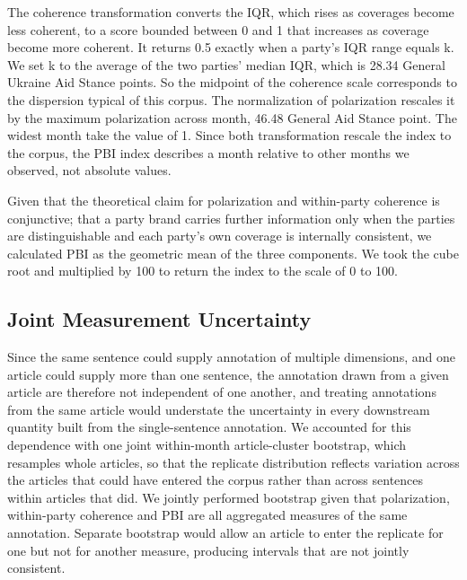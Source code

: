 The coherence transformation converts the IQR, which rises as coverages become less coherent, to a score bounded between 0 and 1 that increases as coverage become more coherent. It returns 0.5 exactly when a party's IQR range equals k. We set k to the average of the two parties' median IQR, which is 28.34 General Ukraine Aid Stance points. So the midpoint of the coherence scale corresponds to the dispersion typical of this corpus. The normalization of polarization rescales it by the maximum polarization across month, 46.48 General Aid Stance point. The widest month take the value of 1. Since both transformation rescale the index to the corpus, the PBI index describes a month relative to other months we observed, not absolute values.

Given that the theoretical claim for polarization and within-party coherence is conjunctive; that a party brand carries further information only when the parties are distinguishable and each party's own coverage is internally consistent, we calculated PBI as the geometric mean of the three components. We took the cube root and multiplied by 100 to return the index to the scale of 0 to 100.

\subsection{Joint Measurement Uncertainty}

Since the same sentence could supply annotation of multiple dimensions, and one article could supply more than one sentence, the annotation drawn from a given article are therefore not independent of one another, and treating annotations from the same article would understate the uncertainty in every downstream quantity built from the single-sentence annotation. We accounted for this dependence with one joint within-month article-cluster bootstrap, which resamples whole articles, so that the replicate distribution reflects variation across the articles that could have entered the corpus rather than across sentences within articles that did. We jointly performed bootstrap given that polarization, within-party coherence and PBI are all aggregated measures of the same annotation. Separate bootstrap would allow an article to enter the replicate for one but not for another measure, producing intervals that are not jointly consistent.

